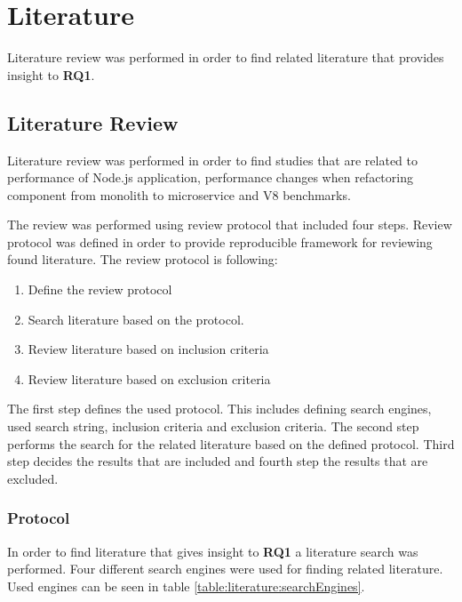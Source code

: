 \section{Literature}
Literature review was performed in order to find related literature that provides insight to \textbf{RQ1}.

\subsection{Literature Review}
Literature review was performed in order to find studies that are related to performance of Node.js application, performance changes when refactoring component from monolith to microservice and V8 benchmarks.

The review was performed using review protocol that included four steps.
Review protocol was defined in order to provide reproducible framework for reviewing found literature.
The review protocol is following:
\begin{enumerate}
    \item Define the review protocol
    \item Search literature based on the protocol.
    \item Review literature based on inclusion criteria
    \item Review literature based on exclusion criteria
\end{enumerate}

The first step defines the used protocol.
This includes defining search engines, used search string, inclusion criteria and exclusion criteria.
The second step performs the search for the related literature based on the defined protocol.
Third step decides the results that are included and fourth step the results that are excluded.
\subsubsection{Protocol}
In order to find literature that gives insight to \textbf{RQ1} a literature search was performed.
Four different search engines were used for finding related literature.
Used engines can be seen in table \ref{table:literature:searchEngines}.


